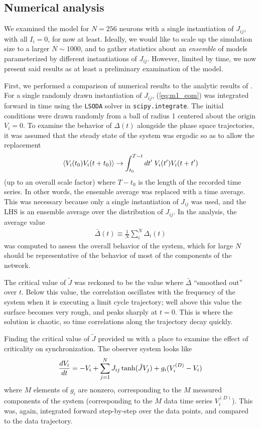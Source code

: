 \documentclass{article} %
\begin{document}
\subsection{Numerical analysis}
We examined the model for $N=256$ neurons with a single instantiation of $J_{ij}$, with all $I_i=0$, for now at least.  Ideally, we would like to scale up the simulation size to a larger $N \sim 1000$, and to gather statistics about an \emph{ensemble} of models parameterized by different instantiations of $J_{ij}$.  However, limited by time, we now present said results as at least a preliminary examination of the model.

First, we performed a comparison of numerical results to the analytic results of \cite{Sompolinsky1988}.  For a single randomly drawn instantiation of $J_{ij}$, (\ref{eq:m1_eom}) was integrated forward in time using the \texttt{LSODA} solver in \texttt{scipy.integrate}.  The initial conditions were drawn randomly from a ball of radius 1 centered about the origin $V_i=0$.  To examine the behavior of $\Delta(t)$ alongside the phase space trajectories, it was assumed that the steady state of the system was ergodic so as to allow the replacement
\begin{align*}
	\left\langle V_i(t_0)V_i(t+t_0) \right\rangle \rightarrow \int_{t_0}^{T-t} dt^{\prime} \; V_i(t^{\prime}) V_i(t+t^{\prime})
\end{align*}
(up to an overall scale factor) where $T-t_0$ is the length of the recorded time series.  In other words, the ensemble average was replaced with a time average.  This was necessary because only a single instantiation of $J_{ij}$ was used, and the LHS is an ensemble average over the distribution of $J_{ij}$.  In the analysis, the average value
\begin{align}
	\bar{\Delta}(t) \equiv \frac{1}{N} \sum_i^N \Delta_i(t)
\end{align}
was computed to assess the overall behavior of the system, which for large $N$ should be representative of the behavior of most of the components of the network.

The critical value of $\tilde{J}$ was reckoned to be the value where $\bar{\Delta}$ ``smoothed out'' over $t$.  Below this value, the correlation oscillates with the frequency of the system when it is executing a limit cycle trajectory; well above this value the surface becomes very rough, and peaks sharply at $t=0$.  This is where the solution is chaotic, so time correlations along the trajectory decay quickly.

Finding the critical value of $\tilde{J}$ provided us with a place to examine the effect of criticality on synchronization. The observer system looks like
\begin{align}
	\frac{d V_i}{d t} = -V_i + \sum_{j=1}^{N} J_{ij} \tanh(\tilde{J} V_j) + g_i (V^{(D)}_i - V_i)
\end{align}
where $M$ elements of $g_i$ are nonzero, corresponding to the $M$ measured components of the system (corresponding to the $M$ data time series $V_i^{(D)}$).  This was, again, integrated forward step-by-step over the data points, and compared to the data trajectory.
\end{document}
